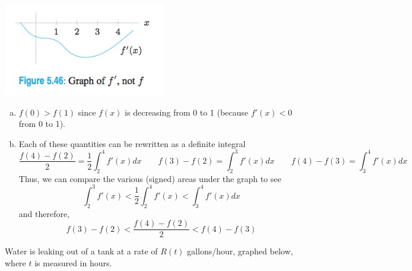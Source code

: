 \documentclass[11pt]{exam}
\begin{document}
\begin{questions}
\begin{multicols}{2}
\columnbreak
\includegraphics[width=2.8in]{Figures/no3334graph.jpg}
\end{multicols}
\begin{solution}
  \begin{enumerate}[(a)]
  \item \(f(0) > f(1)\) since \(f(x)\) is decreasing from 0 to 1
    (because \(f'(x) < 0\) from 0 to 1).
  \item Each of these quantities can be rewritten as a definite
    integral \[
      \frac{f(4)-f(2)}{2} = \frac{1}{2} \int_2^4 f'(x) dx \qquad
      f(3)-f(2) = \int_2^3 f'(x) dx \qquad f(4) - f(3) =
      \int_3^4 f'(x) dx
    \]
    Thus, we can compare the various (signed) areas under the graph to see \[
      \int_2^3 f'(x) < \frac{1}{2} \int_2^4 f'(x) < \int_3^4 f'(x) dx
    \]
    and therefore, \[
      f(3) - f(2) < \frac{f(4)-f(2)}{2} < f(4) - f(3)
    \]
  \end{enumerate}
\end{solution}
\question Water is leaking out of a tank at a rate of \(R(t)\)
  gallons/hour, graphed below, where \(t\) is measured in hours.
  \begin{multicols}{2}
\end{multicols}
\end{questions}
\end{document}

